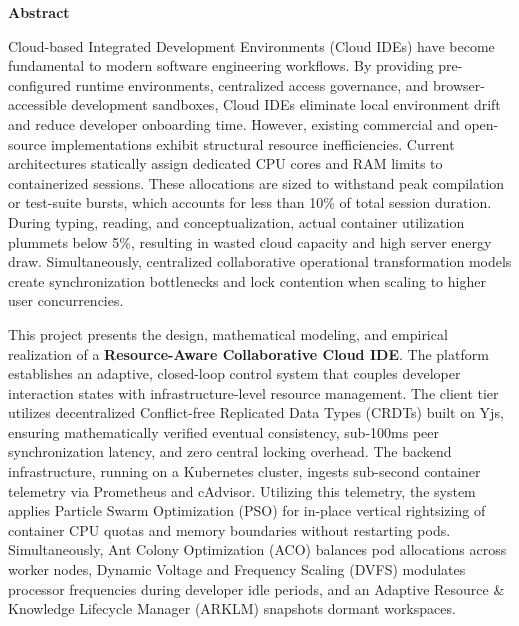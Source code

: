 \documentclass[12pt,a4paper]{report}
\begin{document}
\clearpage
{}
\setcounter{page}{1}

\begin{center}
    \vspace*{0.2cm}
    {\Huge \textbf{Abstract}}
\end{center}
\vspace{0.3cm}
\thispagestyle{plain}
Cloud-based Integrated Development Environments (Cloud IDEs) have become fundamental to modern software engineering workflows. By providing pre-configured runtime environments, centralized access governance, and browser-accessible development sandboxes, Cloud IDEs eliminate local environment drift and reduce developer onboarding time. However, existing commercial and open-source implementations exhibit structural resource inefficiencies. Current architectures statically assign dedicated CPU cores and RAM limits to containerized sessions. These allocations are sized to withstand peak compilation or test-suite bursts, which accounts for less than 10\% of total session duration. During typing, reading, and conceptualization, actual container utilization plummets below 5\%, resulting in wasted cloud capacity and high server energy draw. Simultaneously, centralized collaborative operational transformation models create synchronization bottlenecks and lock contention when scaling to higher user concurrencies.

This project presents the design, mathematical modeling, and empirical realization of a \textbf{Resource-Aware Collaborative Cloud IDE}. The platform establishes an adaptive, closed-loop control system that couples developer interaction states with infrastructure-level resource management. The client tier utilizes decentralized Conflict-free Replicated Data Types (CRDTs) built on Yjs, ensuring mathematically verified eventual consistency, sub-100ms peer synchronization latency, and zero central locking overhead. The backend infrastructure, running on a Kubernetes cluster, ingests sub-second container telemetry via Prometheus and cAdvisor. Utilizing this telemetry, the system applies Particle Swarm Optimization (PSO) for in-place vertical rightsizing of container CPU quotas and memory boundaries without restarting pods. Simultaneously, Ant Colony Optimization (ACO) balances pod allocations across worker nodes, Dynamic Voltage and Frequency Scaling (DVFS) modulates processor frequencies during developer idle periods, and an Adaptive Resource \& Knowledge Lifecycle Manager (ARKLM) snapshots dormant workspaces.
\end{document}
